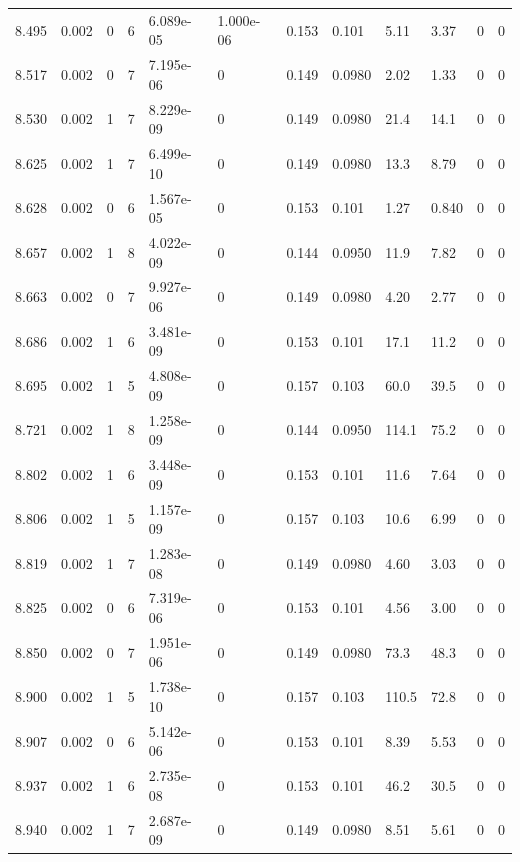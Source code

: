 \documentclass[preview]{standalone}
\begin{document}
{{{{{{{{\begin{tabular}{L{1.2cm}C{1.2cm} C{0.3cm}C{0.5cm} C{1.4cm}C{1.4cm} C{1.4cm}C{1.4cm} C{1.6cm}C{1.6cm} C{1.6cm}C{1.6cm}}
  8.495  &  0.002  & 0     &  6 &  6.089e-05  & 1.000e-06  &  0.153&   0.101& 5.11 & 3.37   &  0 & 0  \\ 
  8.517  &  0.002  & 0     &  7 &  7.195e-06  & 0  &  0.149&   0.0980& 2.02 & 1.33   &  0 & 0  \\ 
  8.530  &  0.002  & 1     &  7 &  8.229e-09  & 0  &  0.149&   0.0980& 21.4 & 14.1   &  0 & 0  \\ 
  8.625  &  0.002  & 1     &  7 &  6.499e-10  & 0  &  0.149&   0.0980& 13.3 & 8.79   &  0 & 0  \\ 
  8.628  &  0.002  & 0     &  6 &  1.567e-05  & 0  &  0.153&   0.101& 1.27 & 0.840   &  0 & 0  \\ 
  8.657  &  0.002  & 1     &  8 &  4.022e-09  & 0  &  0.144&   0.0950& 11.9 & 7.82   &  0 & 0  \\ 
  8.663  &  0.002  & 0     &  7 &  9.927e-06  & 0  &  0.149&   0.0980& 4.20 & 2.77   &  0 & 0  \\ 
  8.686  &  0.002  & 1     &  6 &  3.481e-09  & 0  &  0.153&   0.101& 17.1 & 11.2   &  0 & 0  \\ 
  8.695  &  0.002  & 1     &  5 &  4.808e-09  & 0  &  0.157&   0.103& 60.0 & 39.5   &  0 & 0  \\ 
  8.721  &  0.002  & 1     &  8 &  1.258e-09  & 0  &  0.144&   0.0950& 114.1 & 75.2   &  0 & 0  \\ 
  8.802  &  0.002  & 1     &  6 &  3.448e-09  & 0  &  0.153&   0.101& 11.6 & 7.64   &  0 & 0  \\ 
  8.806  &  0.002  & 1     &  5 &  1.157e-09  & 0  &  0.157&   0.103& 10.6 & 6.99   &  0 & 0  \\ 
  8.819  &  0.002  & 1     &  7 &  1.283e-08  & 0  &  0.149&   0.0980& 4.60 & 3.03   &  0 & 0  \\ 
  8.825  &  0.002  & 0     &  6 &  7.319e-06  & 0  &  0.153&   0.101& 4.56 & 3.00   &  0 & 0  \\ 
  8.850  &  0.002  & 0     &  7 &  1.951e-06  & 0  &  0.149&   0.0980& 73.3 & 48.3   &  0 & 0  \\ 
  8.900  &  0.002  & 1     &  5 &  1.738e-10  & 0  &  0.157&   0.103& 110.5 & 72.8   &  0 & 0  \\ 
  8.907  &  0.002  & 0     &  6 &  5.142e-06  & 0  &  0.153&   0.101& 8.39 & 5.53   &  0 & 0  \\ 
  8.937  &  0.002  & 1     &  6 &  2.735e-08  & 0  &  0.153&   0.101& 46.2 & 30.5   &  0 & 0  \\ 
  8.940  &  0.002  & 1     &  7 &  2.687e-09  & 0  &  0.149&   0.0980& 8.51 & 5.61   &  0 & 0  \\ 

\end{tabular}}}}}}}}}
\end{document}
